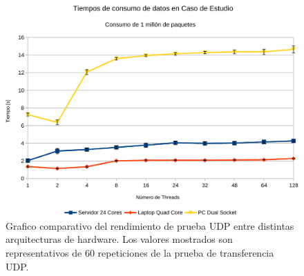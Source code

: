 \begin{figure}[h!]
	\centering
	\includegraphics[scale=0.5]{resultados/transferenciaUDP1-crop.pdf}
	\caption{Grafico comparativo del rendimiento de prueba UDP entre distintas arquitecturas de hardware. Los valores mostrados son representativos de 60 repeticiones de la prueba de transferencia UDP.}
	\label{fig:tests_arch}
\end{figure}

